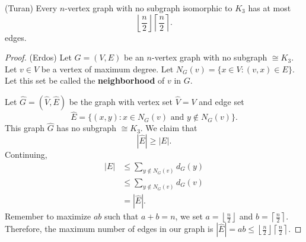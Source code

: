 \begin{theorem}
	(Turan) Every \( n \)-vertex graph with no subgraph isomorphic to \( K_3 \) has at most \[
		\left\lfloor \frac{n}{2} \right\rfloor \left\lceil \frac{n}{2} \right\rceil 
	.\] edges.
\end{theorem}
\begin{proof}
	(Erdos) Let \( G = (V,E) \) be an \( n \)-vertex graph with no subgraph \( \cong K_3 \). Let \( v \in V \) be a vertex of maximum degree. Let \( N_G(v) = \{x \in V : (v, x) \in E\}   \). Let this set be called the \textbf{neighborhood} of \( v \) in \( G \). 

	Let \( \hat{G} = (\hat{V}, \hat{E})\) be the graph with vertex set \( \hat{V}=V \) and edge set \[
		\hat{E}=\{(x, y) : x \in N_G(v) \text{ and } y \not\in N_G(v)\}  
	.\] This graph \( \hat{G} \) has no subgraph \( \cong K_3 \). We claim that \[
		|\hat{E}| \ge |E|
	.\] Continuing, 
	\begin{align*}
		|E| &\le \sum_{y \not\in N_G(v)} d_G(y) \\
				&\le \sum_{y \not\in N_G(v)} d_G(v)\\
				&=|\hat{E}| 
	.\end{align*}
	Remember to maximize \( ab \) such that \( a+b=n \), we set \( a=\left\lfloor \frac{n}{2} \right\rfloor \) and \( b=\left\lceil \frac{n}{2} \right\rceil  \). Therefore, the maximum number of edges in our graph is \( |\hat{E}| = ab \le  \left\lfloor \frac{n}{2} \right\rfloor  \left\lceil \frac{n}{2} \right\rceil \).
\end{proof}

